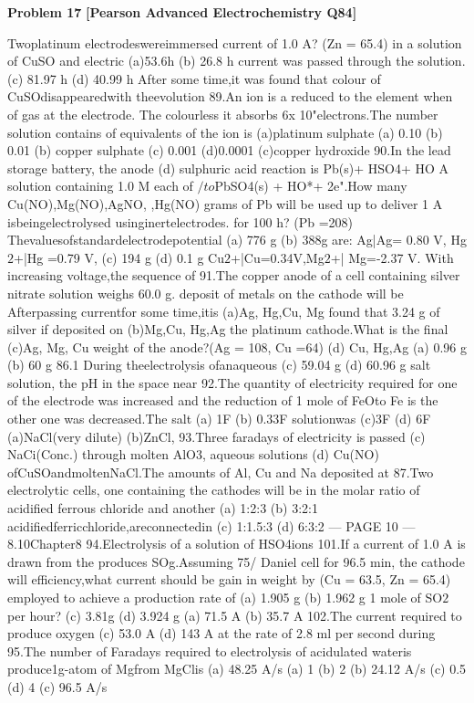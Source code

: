 \begin{problembox}
\textbf{Problem 17} \hfill \textbf{[Pearson Advanced Electrochemistry Q84]}
\label{q:ext-pearson-17}

Twoplatinum electrodeswereimmersed
current of 1.0 A? (Zn = 65.4)
in a solution of CuSO and electric
(a)53.6h
(b) 26.8 h
current was passed through the solution.
(c) 81.97 h
(d) 40.99 h
After some time,it was found that colour
of CuSOdisappearedwith theevolution
89.An ion is a reduced to the element when
of gas at the electrode. The colourless
it absorbs 6x 10"electrons.The number
solution contains
of equivalents of the ion is
(a)platinum sulphate
(a) 0.10
(b) 0.01
(b) copper sulphate
(c) 0.001
(d)0.0001
(c)copper hydroxide
90.In the lead storage battery, the anode
(d) sulphuric acid
reaction is Pb(s)+ HSO4+ HO
A solution containing 1.0 M each of
$/to$PbSO4(s) + HO*+ 2e".How many
Cu(NO),Mg(NO),AgNO, ,Hg(NO)
grams of Pb will be used up to deliver 1 A
isbeingelectrolysed usinginertelectrodes.
for 100 h? (Pb =208)
Thevaluesofstandardelectrodepotential
(a) 776 g
(b) 388g
are: Ag|Ag= 0.80 V, Hg$2$+|Hg =0.79 V,
(c) 194 g
(d) 0.1 g
Cu$2$+|Cu=0.34V,Mg$2$+| Mg=-2.37 V.
With increasing voltage,the sequence of
91.The copper anode of a cell containing
silver nitrate solution weighs 60.0 g.
deposit of metals on the cathode will be
Afterpassing currentfor some time,itis
(a)Ag, Hg,Cu, Mg
found that 3.24 g of silver if deposited on
(b)Mg,Cu, Hg,Ag
the platinum cathode.What is the final
(c)Ag, Mg, Cu
weight of the anode?(Ag = 108, Cu =64)
(d) Cu, Hg,Ag
(a) 0.96 g
(b) 60 g
86.1
During theelectrolysis ofanaqueous
(c) 59.04 g
(d) 60.96 g
salt solution, the pH in the space near
92.The quantity of electricity required for
one of the electrode was increased and
the reduction of 1 mole of FeOto Fe is
the other one was decreased.The salt
(a) 1F
(b) 0.33F
solutionwas
(c)3F
(d) 6F
(a)NaCl(very dilute)
(b)ZnCl,
93.Three faradays of electricity is passed
(c) NaCi(Conc.)
through molten AlO3, aqueous solutions
(d) Cu(NO)
ofCuSOandmoltenNaCl.The
amounts of Al, Cu and Na deposited at
87.Two electrolytic cells, one containing
the cathodes will be in the molar ratio of
acidified ferrous chloride and another
(a) 1:2:3
(b) 3:2:1
acidifiedferricchloride,areconnectedin
(c) 1:1.5:3
(d) 6:3:2
--- PAGE 10 ---
8.10Chapter8
94.Electrolysis of a solution of HSO4ions
101.If a current of 1.0 A is drawn from the
produces SOg.Assuming 75/%
Daniel cell for 96.5 min, the cathode will
efficiency,what current should be
gain in weight by (Cu = 63.5, Zn = 65.4)
employed to achieve a production rate of
(a) 1.905 g
(b) 1.962 g
1 mole of SO$2$per hour?
(c) 3.81g
(d) 3.924 g
(a) 71.5 A
(b) 35.7 A
102.The current required to produce oxygen
(c) 53.0 A
(d) 143 A
at the rate of 2.8 ml per second during
95.The number of Faradays required to
electrolysis of acidulated wateris
produce1g-atom of Mgfrom MgClis
(a) 48.25 A/s
(a) 1
(b) 2
(b) 24.12 A/s
(c) 0.5
(d) 4
(c) 96.5 A/s
\end{problembox}

